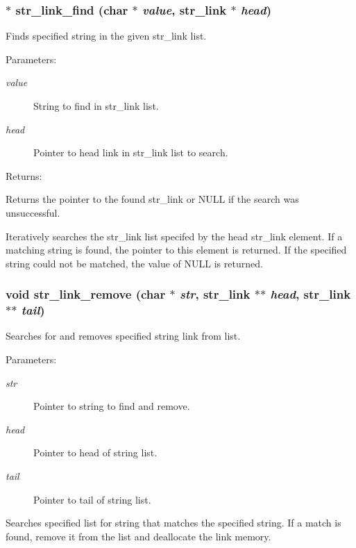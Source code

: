 \subsubsection{$\ast$ str\_\-link\_\-find (char $\ast$ {\em value}, {\bf str\_\-link} $\ast$ {\em head})}\label{link_8c_a11}


Finds specified string in the given str\_\-link list.

\begin{Desc}
\item[Parameters: ]\par
\begin{description}
\item[{\em 
value}]String to find in str\_\-link list. \item[{\em 
head}]Pointer to head link in str\_\-link list to search. \end{description}
\end{Desc}
\begin{Desc}
\item[Returns: ]\par
Returns the pointer to the found str\_\-link or NULL if the search was unsuccessful.\end{Desc}
Iteratively searches the str\_\-link list specifed by the head str\_\-link element. If a matching string is found, the pointer to this element is returned. If the specified string could not be matched, the value of NULL is returned. 
\subsubsection{\setlength{\rightskip}{0pt plus 5cm}void str\_\-link\_\-remove (char $\ast$ {\em str}, {\bf str\_\-link} $\ast$$\ast$ {\em head}, {\bf str\_\-link} $\ast$$\ast$ {\em tail})}\label{link_8c_a16}


Searches for and removes specified string link from list.

\begin{Desc}
\item[Parameters: ]\par
\begin{description}
\item[{\em 
str}]Pointer to string to find and remove. \item[{\em 
head}]Pointer to head of string list. \item[{\em 
tail}]Pointer to tail of string list.\end{description}
\end{Desc}
Searches specified list for string that matches the specified string. If a match is found, remove it from the list and deallocate the link memory. 